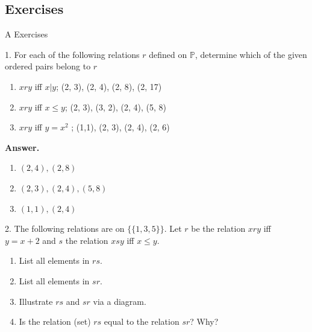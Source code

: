 \documentclass[10pt,]{book}
\theoremstyle{plain}
\theoremstyle{definition}
\theoremstyle{definition}
\theoremstyle{definition}
\theoremstyle{definition}
\begin{document}
\subsection[Exercises]{Exercises}\label{exercises-6-1}
\hypertarget{exercisegroup-1}{}\typeout{************************************************}
\typeout{************************************************}
A Exercises%
\begin{exercisegroup}
\item[1.]\hypertarget{exercise-1}{} For each of the following relations \(r\) defined on \(\mathbb{P}\), determine which of the given ordered pairs belong to \(r\)%
\par
\leavevmode%
\begin{enumerate}[label=\alph*]
\item\hypertarget{li-1}{} \(x r y\) iff \(x|y\);  (2, 3), (2, 4), (2, 8), (2, 17)%
\item\hypertarget{li-2}{} \(x r y\) iff \(x \leq  y\); (2, 3), (3, 2), (2, 4), (5, 8)%
\item\hypertarget{li-3}{} \(x r y\) iff \(y =x^2\) ; (1,1), (2, 3), (2, 4), (2, 6)%
\end{enumerate}
%
\par\smallskip
\par\smallskip
\noindent\textbf{Answer.}\hypertarget{answer-1}{}\quad
\leavevmode%
\begin{enumerate}[label=\alph*]
\item\hypertarget{li-4}{} \((2,4), (2,8)\)   %
\item\hypertarget{li-5}{} \((2, 3), (2, 4), (5,8)\)   %
\item\hypertarget{li-6}{} \((1,1), (2,4)\)%
\end{enumerate}
%
\item[2.]\hypertarget{exercise-2}{} The following relations are on \(\{\{1, 3, 5\}\}\). Let \(r\) be the relation \(x r y\) iff \(y = x + 2\) and \(s\) the
relation \(x s y\) iff \(x \leq  y\).%
\par
\leavevmode%
\begin{enumerate}[label=\alph*]
\item\hypertarget{li-7}{} List all elements in  \(rs\).%
\item\hypertarget{li-8}{} List all elements in  \(sr\).%
\item\hypertarget{li-9}{} Illustrate \(rs\) and \(sr\) via a diagram.%
\item\hypertarget{li-10}{} Is the relation (set) \(rs\) equal to the relation \(sr\)? Why?%

\end{enumerate}
\end{exercisegroup}
\end{document}
